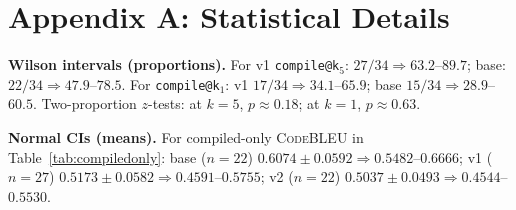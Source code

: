\documentclass[10pt,conference]{IEEEtran}
\makeatletter
\newcommand{\codebleu}{\textsc{CodeBLEU}\xspace}
\newcommand{\compileatk}{\texttt{compile@k}\xspace}
\makeatother
\begin{document}
\appendix
\section*{Appendix A: Statistical Details}
\textbf{Wilson intervals (proportions).} For v1 \compileatk$_5$: $27/34 \Rightarrow 63.2$--$89.7$; base: $22/34 \Rightarrow 47.9$--$78.5$. For \compileatk$_1$: v1 $17/34 \Rightarrow 34.1$--$65.9$; base $15/34 \Rightarrow 28.9$--$60.5$. Two-proportion $z$-tests: at $k{=}5$, $p \approx 0.18$; at $k{=}1$, $p \approx 0.63$.

\textbf{Normal CIs (means).} For compiled-only \codebleu{} in Table~\ref{tab:compiledonly}: base ($n{=}22$) $0.6074 \pm 0.0592 \Rightarrow 0.5482$--$0.6666$; v1 ($n{=}27$) $0.5173 \pm 0.0582 \Rightarrow 0.4591$--$0.5755$; v2 ($n{=}22$) $0.5037 \pm 0.0493 \Rightarrow 0.4544$--$0.5530$.
\end{document}
